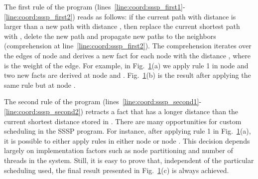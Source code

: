 \begin{figure}
\begin{center}
\begin{subfigure}[b]{0.49\textwidth}
      \mycap{}
   \end{subfigure}
\end{center}


\label{fig:shortest_path_program}
\end{figure}

The first rule of the program
(lines~\ref{line:coord:sssp_first1}-\ref{line:coord:sssp_first2}) reads as
follows: if the current  path  with distance 
is larger than a new path  with distance , then replace the
current shortest path with , delete the new  path and
propagate new paths to the neighbors (comprehension at
line~\ref{line:coord:sssp_first2}). The comprehension iterates over the edges of
node  and derives a new  fact for each node  with
the distance , where  is the weight of the edge. For
example, in Fig.~\ref{fig:shortest_path_program}(a) we apply rule 1 in node
 and two new  facts are derived at node  and
.  Fig.~\ref{fig:shortest_path_program}(b) is the result after
applying the same rule but at node .

The second rule of the program
(lines~\ref{line:coord:sssp_second1}-\ref{line:coord:sssp_second2}) retracts a
 fact that has a longer distance than the current shortest distance
stored in . There are many opportunities for custom scheduling
in the SSSP program. For instance, after applying rule 1 in
Fig.~\ref{fig:shortest_path_program}(a), it is possible to either apply rules
in either node  or node .  This decision depends largely on
implementation factors such as node partitioning and number of threads in the
system. Still, it is easy to prove that, independent of the particular scheduling used, the final
result presented in Fig.~\ref{fig:shortest_path_program}(c) is always achieved.

